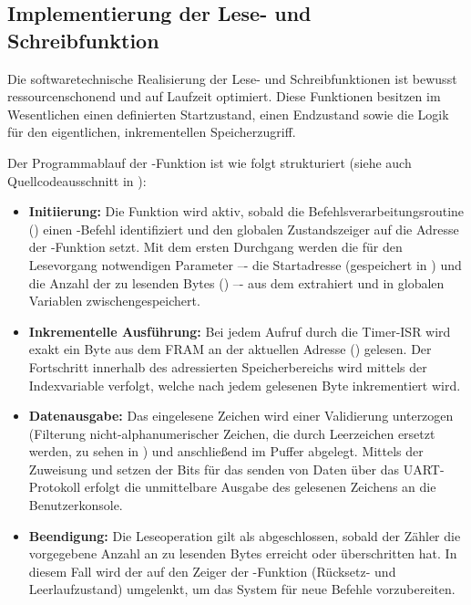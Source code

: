 
\newpage
\subsection{Implementierung der Lese- und Schreibfunktion}
\label{sec:Implementierung_Lesen_Schreiben}

Die softwaretechnische Realisierung der Lese- und Schreibfunktionen ist bewusst ressourcenschonend und auf Laufzeit optimiert. Diese Funktionen besitzen im Wesentlichen einen definierten Startzustand, einen Endzustand sowie die Logik f\"ur den eigentlichen, inkrementellen Speicherzugriff.

Der Programmablauf der -Funktion ist wie folgt strukturiert (siehe auch Quellcodeausschnitt in ):
\begin{itemize}
	\item \textbf{Initiierung:} Die Funktion wird aktiv, sobald die Befehlsverarbeitungsroutine () einen \glqq{}\grqq{}-Befehl identifiziert und den globalen Zustandszeiger  auf die Adresse der -Funktion setzt. Mit dem ersten Durchgang werden die f\"ur den Lesevorgang notwendigen Parameter –- die Startadresse (gespeichert in ) und die Anzahl der zu lesenden Bytes () –- aus dem  extrahiert und in globalen Variablen zwischengespeichert.
	
	\item \textbf{Inkrementelle Ausf\"uhrung:} Bei jedem Aufruf durch die Timer-ISR wird exakt ein Byte aus dem FRAM an der aktuellen Adresse () gelesen. Der Fortschritt innerhalb des adressierten Speicherbereichs wird mittels der Indexvariable  verfolgt, welche nach jedem gelesenen Byte inkrementiert wird.
	
	\item \textbf{Datenausgabe:} Das eingelesene Zeichen wird einer Validierung unterzogen (Filterung nicht-alphanumerischer Zeichen, die durch Leerzeichen ersetzt werden, zu sehen in ) und anschlie{\ss}end im Puffer  abgelegt. Mittels der Zuweisung \glqq{}\grqq{} und setzen der Bits f\"ur das senden von Daten \"uber das UART-Protokoll erfolgt die unmittelbare Ausgabe des gelesenen Zeichens an die Benutzerkonsole.
	
	\item \textbf{Beendigung:} Die Leseoperation gilt als abgeschlossen, sobald der Z\"ahler  die vorgegebene Anzahl an zu lesenden Bytes erreicht oder \"uberschritten hat. In diesem Fall wird der  auf den Zeiger der -Funktion (R\"ucksetz- und Leerlaufzustand) umgelenkt, um das System f\"ur neue Befehle vorzubereiten.
\end{itemize}

